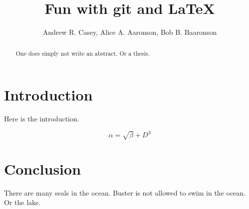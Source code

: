\documentclass{article}
\begin{document}
\title{Fun with git and \LaTeX{}}
\author{Andrew R. Casey, Alice A. Aaronson, Bob B. Baaronson}

\maketitle

\begin{abstract}
One does simply not write an abstract. Or a thesis.
\end{abstract}

\section{Introduction}
Here is the introduction.

\begin{equation}
    \label{simple_equation}
    \alpha = \sqrt{ \beta } + D^3
\end{equation}


\section{Conclusion}
There are many seals in the ocean. Buster is not allowed to swim in the ocean. Or the lake.
\end{document}

